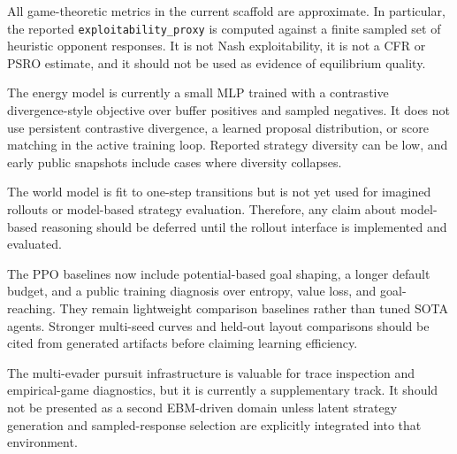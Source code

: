 All game-theoretic metrics in the current scaffold are approximate.
In particular, the reported \texttt{exploitability\_proxy} is computed against a finite sampled set of heuristic opponent responses.
It is not Nash exploitability, it is not a CFR or PSRO estimate, and it should not be used as evidence of equilibrium quality.

The energy model is currently a small MLP trained with a contrastive divergence-style objective over buffer positives and sampled negatives.
It does not use persistent contrastive divergence, a learned proposal distribution, or score matching in the active training loop.
Reported strategy diversity can be low, and early public snapshots include cases where diversity collapses.

The world model is fit to one-step transitions but is not yet used for imagined rollouts or model-based strategy evaluation.
Therefore, any claim about model-based reasoning should be deferred until the rollout interface is implemented and evaluated.

The PPO baselines now include potential-based goal shaping, a longer default budget, and a public training diagnosis over entropy, value loss, and goal-reaching.
They remain lightweight comparison baselines rather than tuned SOTA agents.
Stronger multi-seed curves and held-out layout comparisons should be cited from generated artifacts before claiming learning efficiency.

The multi-evader pursuit infrastructure is valuable for trace inspection and empirical-game diagnostics, but it is currently a supplementary track.
It should not be presented as a second EBM-driven domain unless latent strategy generation and sampled-response selection are explicitly integrated into that environment.
